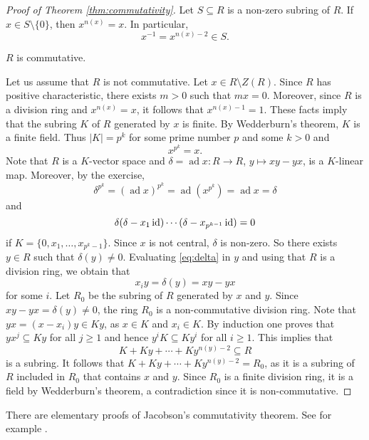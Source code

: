 \begin{proof}[Proof of Theorem \ref{thm:commutativity}]
    Let $S\subseteq R$ is a non-zero subring of $R$. If $x\in S\setminus\{0\}$, 
    then 
    $x^{n(x)}=x$. In particular, 
    \[
    x^{-1}=x^{n(x)-2}\in S.
    \]
    
    \begin{claim}
        $R$ is commutative.
    \end{claim}
    
    Let us assume that $R$ is not commutative. Let $x\in R\setminus Z(R)$. 
    Since $R$ has positive characteristic, there exists $m>0$ such that 
    $mx=0$. Moreover, since $R$ is a division ring and 
    $x^{n(x)}=x$, it follows that $x^{n(x)-1}=1$. These facts imply that
    the subring $K$ of $R$ generated by
    $x$ is finite. By Wedderburn's theorem, $K$ is 
    a finite field. 
    Thus 
    $|K|=p^k$ for some prime number $p$ and some $k>0$ and 
    \[
    x^{p^k}=x.
    \]
    Note that $R$ is a $K$-vector space
    and $\delta=\operatorname{ad} x\colon R\to R$, $y\mapsto xy-yx$, is a $K$-linear map. Moreover, 
    by the exercise, 
    \[
    \delta^{p^k}=(\operatorname{ad} x)^{p^k}=\operatorname{ad} \left(x^{p^k}\right)=\operatorname{ad} x=\delta
    \]
    and 
    \begin{equation}
        \label{eq:delta}
        \delta(\delta-x_1\operatorname{id})\cdots (\delta-x_{p^{k-1}}\operatorname{id})=0
    \end{equation}
    if $K=\{0,x_1,\dots,x_{p^k-1}\}$. Since $x$ is not central, 
    $\delta$ is non-zero. So there exists $y\in R$ such that $\delta(y)\ne 0$. 
    Evaluating \eqref{eq:delta} in $y$ and using that $R$ is a division ring, 
    we obtain that 
    \[
    x_iy=\delta(y)=xy-yx
    \]
    for some $i$. Let $R_0$ be the subring of $R$ generated by $x$ and $y$. 
    Since $xy-yx=\delta(y)\ne 0$, the ring $R_0$ is a 
    non-commutative division ring. Note that 
    $yx=(x-x_i)y\in Ky$, as $x\in K$ and $x_i\in K$. By induction one proves
    that $yx^j\subseteq Ky$ for all $j\geq 1$ and hence
    $y^iK\subseteq Ky^i$ for
    all $i\geq1$. This implies that
    \[
    K+Ky+\cdots+Ky^{n(y)-2}\subseteq R
    \]
    is a subring. It follows that $K+Ky+\cdots+Ky^{n(y)-2}=R_0$, 
    as it is a subring of $R$ included in $R_0$ 
    that contains $x$ and $y$. Since 
    $R_0$ is a finite division ring, it is a field 
    by Wedderburn's theorem, a contradiction since
    it is non-commutative.
\end{proof}

There are elementary proofs of Jacobson's commutativity theorem.
See for example \cite{MR347890}. 

